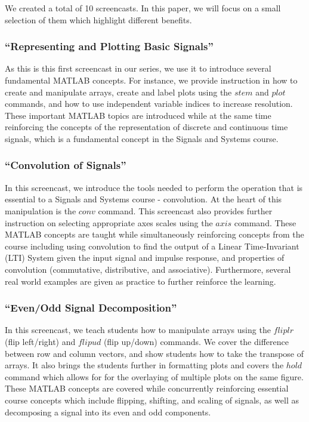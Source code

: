 \documentclass[a4paper,10pt]{article}
\begin{document}
We created a total of 10 screencasts. In this paper, we will focus on a small selection of them which highlight different benefits.

\subsubsection{``Representing and Plotting Basic Signals''}

As this is this first screencast in our series, we use it to introduce several fundamental MATLAB concepts.  For instance, we provide instruction in how to create and manipulate arrays, create and label plots using the $stem$ and $plot$ commands, and how to use independent variable indices to increase resolution.  These important MATLAB topics are introduced while at the same time reinforcing the concepts of the representation of discrete and continuous time signals, which is a fundamental concept in the Signals and Systems course.

\subsubsection{``Convolution of Signals''}
In this screencast, we introduce the tools needed to perform the operation that is essential to a Signals and Systems course - convolution. At the heart of this manipulation is the $conv$ command. This screencast also provides further instruction on selecting appropriate axes scales using the $axis$ command. These MATLAB concepts are taught while simultaneously reinforcing concepts from the course including using convolution to find the output of a Linear Time-Invariant (LTI) System given the input signal and impulse response, and properties of convolution (commutative, distributive, and associative). Furthermore, several real world examples are given as practice to further reinforce the learning.

\subsubsection{``Even/Odd Signal Decomposition''}
In this screencast, we teach students how to manipulate arrays using the $fliplr$ (flip left/right) and $flipud$ (flip up/down) commands. We cover the difference between row and column vectors, and show students how to take the transpose of arrays. It also brings the students further in formatting plots and covers the $hold$ command which allows for for the overlaying of multiple plots on the same figure. These MATLAB concepts are covered while concurrently reinforcing essential course concepts which include flipping, shifting, and scaling of signals, as well as decomposing a signal into its even and odd components.  
\end{document}
